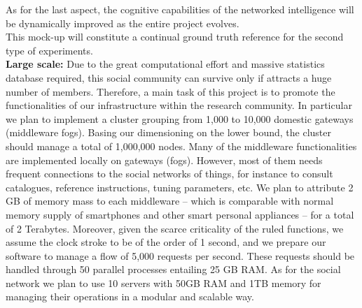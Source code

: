 As for the last aspect, the cognitive capabilities of the networked intelligence will be dynamically improved as the entire project evolves.\\

This mock-up will constitute a continual ground truth reference for the second type of experiments.\\


\textbf{Large scale:}
Due to the great computational effort and massive statistics database required, this social community can survive only if attracts a huge number of members. Therefore, a main task of this project is to promote the functionalities of our infrastructure within the research community. In particular we plan to implement a cluster grouping from 1,000 to 10,000 domestic gateways (middleware fogs). Basing our dimensioning on the lower bound, the cluster should manage a total of 1,000,000 nodes. Many of the middleware functionalities are implemented locally on gateways (fogs). However, most of them needs frequent connections to the social networks of things, for instance to consult catalogues, reference instructions, tuning parameters, etc. We plan to attribute 2 GB of memory mass to each middleware – which is comparable with normal memory supply of smartphones and other smart personal appliances – for a total of 2 Terabytes. Moreover, given the scarce criticality of the ruled functions, we assume the clock stroke to be of the order of 1 second, and we prepare our software to manage a flow of 5,000 requests per second. These requests should be handled through 50 parallel processes entailing 25 GB RAM. As for the social network we plan to use 10 servers with 50GB RAM and 1TB memory for managing their operations in a modular and scalable way.


